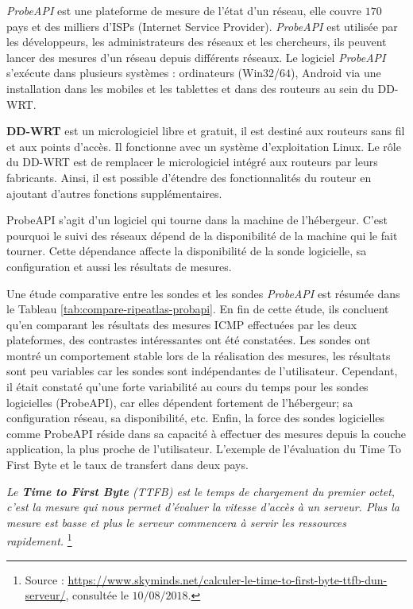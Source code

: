 \textit{ProbeAPI} \cite{PROBEAPI} est  une plateforme de mesure de l'état  d'un réseau,  elle  couvre $170$ pays et des milliers d'ISPs (Internet Service Provider). \textit{ProbeAPI} est utilisée par les développeurs, les administrateurs des réseaux et les chercheurs, ils peuvent lancer des mesures d'un réseau depuis différents réseaux.
Le logiciel \textit{ProbeAPI}  s'exécute dans plusieurs systèmes :  ordinateurs (Win$32$/$64$), Android via une installation dans les mobiles et les tablettes et   dans des routeurs au sein du DD-WRT.
\begin{tcolorbox}
	\textbf{DD-WRT} est un micrologiciel libre et gratuit, il est destiné aux routeurs sans fil et aux points d'accès. Il fonctionne  avec un système d'exploitation Linux. Le rôle du DD-WRT est de remplacer le micrologiciel intégré aux routeurs par leurs fabricants. Ainsi, il est possible  d'étendre des fonctionnalités du routeur en ajoutant d'autres fonctions supplémentaires.
\end{tcolorbox}


ProbeAPI s'agit d'un logiciel qui tourne dans la machine de l'hébergeur. C'est pourquoi le suivi des réseaux dépend de la disponibilité de la machine qui le fait  tourner. Cette dépendance  affecte la disponibilité de la sonde logicielle, sa configuration et aussi les résultats de mesures.

Une étude comparative \cite{COMPARE-ATLAS-PROBEAPI}  entre les sondes   et les sondes \textit{ProbeAPI} est résumée dans le Tableau \ref{tab:compare-ripeatlas-probapi}. 
En fin de cette étude, ils concluent qu'en comparant les résultats des mesures ICMP effectuées par les deux plateformes, des contrastes intéressantes ont été constatées.  Les sondes  ont montré un comportement stable lors de la réalisation  des mesures, les résultats sont peu variables car les sondes sont indépendantes de l'utilisateur. Cependant, il était constaté qu'une forte variabilité au cours du temps pour les sondes logicielles (ProbeAPI), car elles dépendent fortement de l'hébergeur; sa configuration réseau, sa disponibilité, etc.
Enfin, la force des sondes logicielles comme  ProbeAPI réside dans sa capacité  à effectuer des mesures depuis la couche application, la plus proche de l'utilisateur. L'exemple de l'évaluation du Time To First Byte et le taux de transfert dans deux pays.
\begin{tcolorbox}
	\og \textit{	Le \textbf{Time to First Byte} (TTFB) est le temps de chargement du premier octet, c'est la mesure qui nous permet d'évaluer la vitesse d'accès à un serveur. Plus la mesure est basse et plus le serveur commencera à servir les ressources rapidement.} \fg{} \footnote{Source : \url{https://www.skyminds.net/calculer-le-time-to-first-byte-ttfb-dun-serveur/}, consultée le $10/08/2018$.}
\end{tcolorbox}

